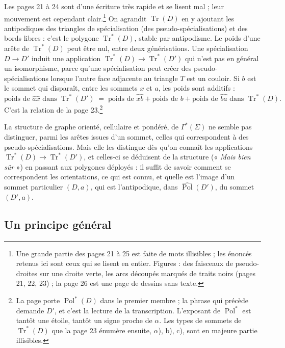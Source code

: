 \documentclass[11pt,a4paper]{article}
\begin{document}
Les pages 21 à 24 sont d'une écriture très rapide et se lisent mal ; leur
mouvement est cependant clair.\footnote{Une grande partie des pages 21 à 25 est
faite de mots illisibles ; les énoncés retenus ici sont ceux qui se lisent en
entier. Figures : des faisceaux de pseudo-droites sur une droite verte, les arcs
découpés marqués de traits noirs (pages 21, 22, 23) ; la page 26 est une page
de dessins sans texte.} On agrandit $\operatorname{Tr}(D)$ en y ajoutant les
antipodiques des triangles de spécialisation (des pseudo-spécialisations) et des bords libres : c'est le polygone
$\operatorname{Tr}^{*}(D)$, stable par antipodisme. Le poids d'une arête de
$\operatorname{Tr}^{*}(D)$ peut être nul, entre deux générisations. Une
spécialisation $D \to D'$ induit une application $\operatorname{Tr}^{*}(D) \to
\operatorname{Tr}^{*}(D')$ qui n'est pas en général un isomorphisme, parce
qu'une spécialisation peut créer des pseudo-spécialisations lorsque l'autre face
adjacente au triangle $T$ est un couloir. Si $b$ est le sommet qui disparaît,
entre les sommets $x$ et $a$, les poids sont additifs :
\[
\text{poids de } \widehat{ax} \text{ dans } \operatorname{Tr}^{*}(D') \;=\;
\text{poids de } \widehat{xb} + \text{poids de } b + \text{poids de }
\widehat{ba} \text{ dans } \operatorname{Tr}^{*}(D).
\]
C'est la relation de la page 23.\footnote{La page porte
$\operatorname{Pol}^{*}(D)$ dans le premier membre ; la phrase qui précède
demande $D'$, et c'est la lecture de la transcription. L'exposant de
$\operatorname{Pol}^{*}$ est tantôt une étoile, tantôt un signe proche de
$\alpha$. Les types de sommets de $\operatorname{Tr}^{*}(D)$ que la page 23
énumère ensuite, $\alpha$), b), c), sont en majeure partie illisibles.}

La structure de graphe orienté, cellulaire et pondéré, de $\Gamma^{*}(\Sigma)$
ne semble pas distinguer, parmi les arêtes issues d'un sommet, celles qui
correspondent à des pseudo-spécialisations. Mais elle les distingue dès qu'on
connaît les applications $\operatorname{Tr}^{*}(D) \to \operatorname{Tr}^{*}(D')$,
et celles-ci se déduisent de la structure (« \emph{Mais bien sûr} ») en
passant aux polygones déployés : il suffit de savoir comment se correspondent
les orientations, ce qui est connu, et quelle est l'image d'un sommet
particulier $(D, a)$, qui est l'antipodique, dans
$\widehat{\operatorname{Pol}}(D')$, du sommet $(D', a)$.

\subsection*{Un principe général}
\end{document}
